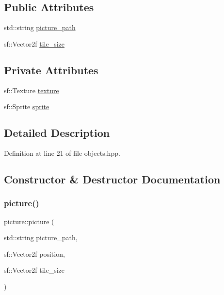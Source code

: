 \subsection*{Public Attributes}
\begin{DoxyCompactItemize}
\item 
std\+::string \hyperlink{classpicture_ab294409095c573549bdc79f9e6d31024}{picture\+\_\+path}
\item 
sf\+::\+Vector2f \hyperlink{classpicture_adff8f66e606a6c2e9a8f8b76d4ced587}{tile\+\_\+size}
\end{DoxyCompactItemize}
\subsection*{Private Attributes}
\begin{DoxyCompactItemize}
\item 
sf\+::\+Texture \hyperlink{classpicture_a030e9c03d143b019986e9a5346746c11}{texture}
\item 
sf\+::\+Sprite \hyperlink{classpicture_abbfcd0b2bcba33144c7e3f34a19f7071}{sprite}
\end{DoxyCompactItemize}


\subsection{Detailed Description}


Definition at line 21 of file objects.\+hpp.



\subsection{Constructor \& Destructor Documentation}
\mbox{\label{classpicture_af52694740d10d5bad731e3cce8c1dd1a}} 
\subsubsection{\texorpdfstring{picture()}{picture()}}
{\footnotesize\ttfamily picture\+::picture (\begin{DoxyParamCaption}\item[{std\+::string}]{picture\+\_\+path,  }\item[{sf\+::\+Vector2f}]{position,  }\item[{sf\+::\+Vector2f}]{tile\+\_\+size }\end{DoxyParamCaption})}



